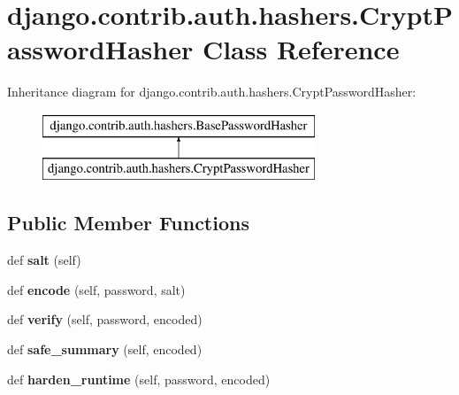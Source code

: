 \hypertarget{classdjango_1_1contrib_1_1auth_1_1hashers_1_1_crypt_password_hasher}{}\section{django.\+contrib.\+auth.\+hashers.\+Crypt\+Password\+Hasher Class Reference}
\label{classdjango_1_1contrib_1_1auth_1_1hashers_1_1_crypt_password_hasher}
Inheritance diagram for django.\+contrib.\+auth.\+hashers.\+Crypt\+Password\+Hasher\+:\begin{figure}[H]
\begin{center}
\leavevmode
\includegraphics[height=2.000000cm]{classdjango_1_1contrib_1_1auth_1_1hashers_1_1_crypt_password_hasher}
\end{center}
\end{figure}
\subsection*{Public Member Functions}
\begin{DoxyCompactItemize}
\item 
\mbox{\label{classdjango_1_1contrib_1_1auth_1_1hashers_1_1_crypt_password_hasher_af30d0cc44d329c94ba01df6bd5b06597}} 
def {\bfseries salt} (self)
\item 
\mbox{\label{classdjango_1_1contrib_1_1auth_1_1hashers_1_1_crypt_password_hasher_ad9a2371fe8b614c634452209c52553ac}} 
def {\bfseries encode} (self, password, salt)
\item 
\mbox{\label{classdjango_1_1contrib_1_1auth_1_1hashers_1_1_crypt_password_hasher_a5e37890ea62454a948e56b7b6d6b9371}} 
def {\bfseries verify} (self, password, encoded)
\item 
\mbox{\label{classdjango_1_1contrib_1_1auth_1_1hashers_1_1_crypt_password_hasher_ab0ca4684e070eaa99d75fc5fce78cb72}} 
def {\bfseries safe\+\_\+summary} (self, encoded)
\item 
\mbox{\label{classdjango_1_1contrib_1_1auth_1_1hashers_1_1_crypt_password_hasher_a62d625e8ed745edb6ad409d4df3b3fab}} 
def {\bfseries harden\+\_\+runtime} (self, password, encoded)
\end{DoxyCompactItemize}
